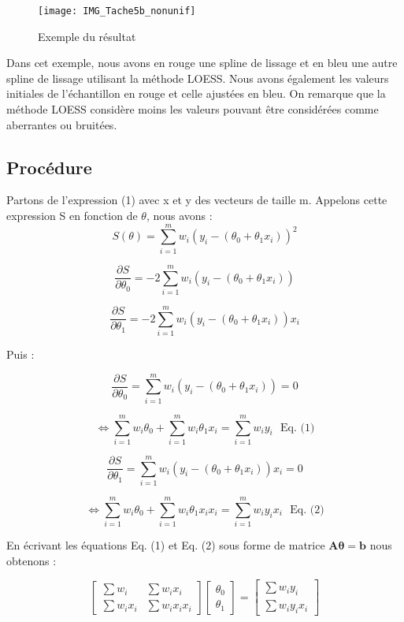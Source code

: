 \documentclass[a4paper,12pt]{article} %
\begin{document}
\begin{figure}[htp]
    \centering
    \texttt{[image: IMG\_Tache5b\_nonunif]}
    \caption{Exemple du résultat }
    \label{fig:uniforme}
\end{figure}

Dans cet exemple, nous avons en rouge une spline de lissage et en bleu une autre spline de lissage utilisant la méthode LOESS.  Nous avons également les valeurs initiales de l'échantillon en rouge et celle ajustées en bleu. On remarque que la méthode LOESS considère moins les valeurs pouvant être considérées comme aberrantes ou bruitées.



\subsection{Procédure}

Partons de l'expression (1) avec  x et y  des vecteurs de taille m. Appelons cette expression S en fonction de $\theta$, nous avons :
\[S(\theta) = \sum_{i=1}^m w_i \left( y_i - (\theta_0 + \theta_1 x_i) \right)^2\]

\[\frac{\partial S}{\partial \theta_0} = -2 \sum_{i=1}^m w_i \left( y_i - (\theta_0 + \theta_1 x_i) \right) \]

\[ \frac{\partial S}{\partial \theta_1} = -2 \sum_{i=1}^m w_i \left( y_i - (\theta_0 + \theta_1 x_i) \right) x_i \]


Puis :

\[\frac{\partial S}{\partial \theta_0} = \sum_{i=1}^m w_i \left( y_i - (\theta_0 + \theta_1 x_i) \right)  = 0\]

\[ \iff \sum_{i=1}^m w_i  \theta_0 + \sum_{i=1}^m w_i  \theta_1 x_i  = \sum_{i=1}^m w_i y_i  \ \ \ \text{Eq. (1)}\]

\[\frac{\partial S}{\partial \theta_1} = \sum_{i=1}^m w_i \left( y_i - (\theta_0 + \theta_1 x_i) \right) x_i  = 0\] 

\[\iff \sum_{i=1}^m w_i  \theta_0 + \sum_{i=1}^m w_i  \theta_1 x_i x_i  = \sum_{i=1}^m w_i y_i  x_i \ \ \ \text{Eq. (2)}\]


En écrivant les équations  Eq. (1) et Eq. (2) sous forme de matrice $\mathbf{A \theta = b}$ nous obtenons :



    \[\begin{bmatrix} \sum w_i & \sum w_i x_i \\ \sum w_i x_i & \sum w_i x_i x_i \end{bmatrix}  \begin{bmatrix} \theta_0 \\ \theta_1 \end{bmatrix}   = \begin{bmatrix}  \sum w_i y_i \\  \sum w_i y_i x_i \end{bmatrix}\] 
\end{document}
